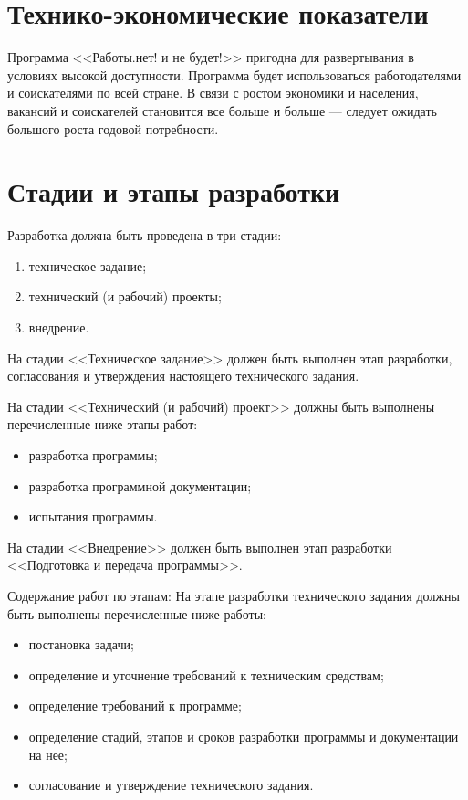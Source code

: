 \documentclass[a4page]{article}
\begin{document}
\section{Технико-экономические показатели}

Программа <<Работы.нет! и не будет!>> пригодна для развертывания в условиях высокой доступности. Программа будет использоваться работодателями и соискателями по всей стране. В связи с ростом экономики и населения, вакансий и соискателей становится все больше и больше --- следует ожидать большого роста годовой потребности.

\section{Стадии и этапы разработки}

Разработка должна быть проведена в три стадии:

\begin{enumerate}
  \item техническое задание;
  \item технический (и рабочий) проекты;
  \item внедрение.
\end{enumerate}

На стадии <<Техническое задание>> должен быть выполнен этап разработки, согласования и утверждения настоящего технического задания.

На стадии <<Технический (и рабочий) проект>> должны быть выполнены перечисленные ниже этапы работ:

\begin{itemize}
  \item разработка программы;
  \item разработка программной документации;
  \item испытания программы.
\end{itemize}

На стадии <<Внедрение>> должен быть выполнен этап разработки <<Подготовка и передача программы>>.

Содержание работ по этапам:
На этапе разработки технического задания должны быть выполнены перечисленные ниже работы:

\begin{itemize}
  \item постановка задачи;
  \item определение и уточнение требований к техническим средствам;
  \item определение требований к программе;
  \item определение стадий, этапов и сроков разработки программы и документации на нее;
  \item согласование и утверждение технического задания.
\end{itemize}
\end{document}
